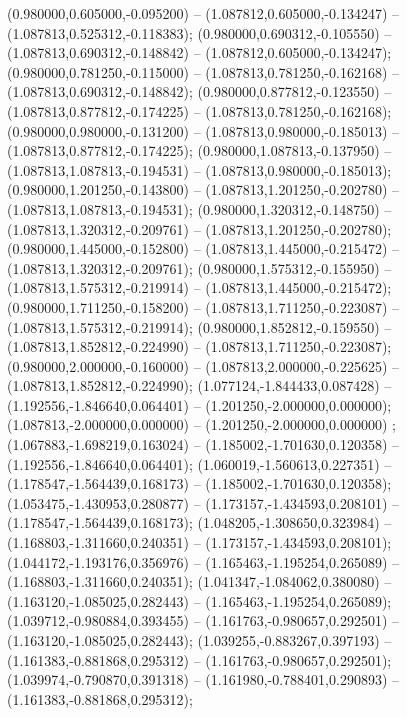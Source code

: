  (0.980000,0.605000,-0.095200) -- (1.087812,0.605000,-0.134247) -- (1.087813,0.525312,-0.118383);
 (0.980000,0.690312,-0.105550) -- (1.087813,0.690312,-0.148842) -- (1.087812,0.605000,-0.134247);
 (0.980000,0.781250,-0.115000) -- (1.087813,0.781250,-0.162168) -- (1.087813,0.690312,-0.148842);
 (0.980000,0.877812,-0.123550) -- (1.087813,0.877812,-0.174225) -- (1.087813,0.781250,-0.162168);
 (0.980000,0.980000,-0.131200) -- (1.087813,0.980000,-0.185013) -- (1.087813,0.877812,-0.174225);
 (0.980000,1.087813,-0.137950) -- (1.087813,1.087813,-0.194531) -- (1.087813,0.980000,-0.185013);
 (0.980000,1.201250,-0.143800) -- (1.087813,1.201250,-0.202780) -- (1.087813,1.087813,-0.194531);
 (0.980000,1.320312,-0.148750) -- (1.087813,1.320312,-0.209761) -- (1.087813,1.201250,-0.202780);
 (0.980000,1.445000,-0.152800) -- (1.087813,1.445000,-0.215472) -- (1.087813,1.320312,-0.209761);
 (0.980000,1.575312,-0.155950) -- (1.087813,1.575312,-0.219914) -- (1.087813,1.445000,-0.215472);
 (0.980000,1.711250,-0.158200) -- (1.087813,1.711250,-0.223087) -- (1.087813,1.575312,-0.219914);
 (0.980000,1.852812,-0.159550) -- (1.087813,1.852812,-0.224990) -- (1.087813,1.711250,-0.223087);
 (0.980000,2.000000,-0.160000) -- (1.087813,2.000000,-0.225625) -- (1.087813,1.852812,-0.224990);
 (1.077124,-1.844433,0.087428) -- (1.192556,-1.846640,0.064401) -- (1.201250,-2.000000,0.000000);
 (1.087813,-2.000000,0.000000) -- (1.201250,-2.000000,0.000000) ;
 (1.067883,-1.698219,0.163024) -- (1.185002,-1.701630,0.120358) -- (1.192556,-1.846640,0.064401);
 (1.060019,-1.560613,0.227351) -- (1.178547,-1.564439,0.168173) -- (1.185002,-1.701630,0.120358);
 (1.053475,-1.430953,0.280877) -- (1.173157,-1.434593,0.208101) -- (1.178547,-1.564439,0.168173);
 (1.048205,-1.308650,0.323984) -- (1.168803,-1.311660,0.240351) -- (1.173157,-1.434593,0.208101);
 (1.044172,-1.193176,0.356976) -- (1.165463,-1.195254,0.265089) -- (1.168803,-1.311660,0.240351);
 (1.041347,-1.084062,0.380080) -- (1.163120,-1.085025,0.282443) -- (1.165463,-1.195254,0.265089);
 (1.039712,-0.980884,0.393455) -- (1.161763,-0.980657,0.292501) -- (1.163120,-1.085025,0.282443);
 (1.039255,-0.883267,0.397193) -- (1.161383,-0.881868,0.295312) -- (1.161763,-0.980657,0.292501);
 (1.039974,-0.790870,0.391318) -- (1.161980,-0.788401,0.290893) -- (1.161383,-0.881868,0.295312);
